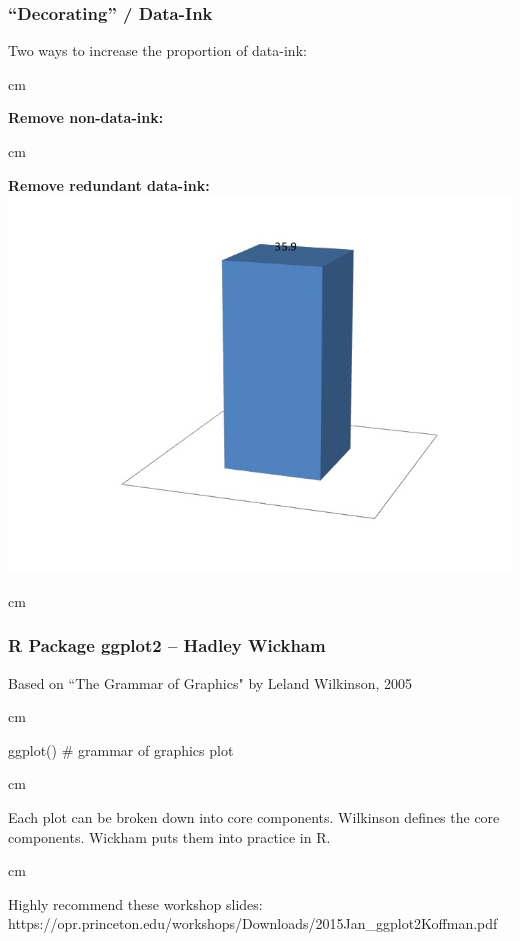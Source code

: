 \documentclass{beamer} %
\begin{document}
\begin{frame}\frametitle{``Decorating'' / Data-Ink}
	\small
	
	Two ways to increase the proportion of data-ink:
	
	 cm
	
	\textbf{Remove non-data-ink:}  
	
	
	 cm
	
	\textbf{Remove redundant data-ink:} \\ 
	\includegraphics[width = 0.6\linewidth]{data-ink.jpg}
	
	 cm
\end{frame}




\begin{frame}\frametitle{R Package ggplot2 -- Hadley Wickham}
	\small
	
	Based on ``The Grammar of Graphics" by Leland Wilkinson, 2005
	
	 cm
	
	ggplot() \# grammar of graphics plot
	
	
	 cm
	
	Each plot can be broken down into core components.  Wilkinson defines the core components.  Wickham puts them into practice in R.
	
	 cm
	
	Highly recommend these workshop slides:\\https://opr.princeton.edu/workshops/Downloads/2015Jan\_ggplot2Koffman.pdf
\end{frame}
\end{document}
